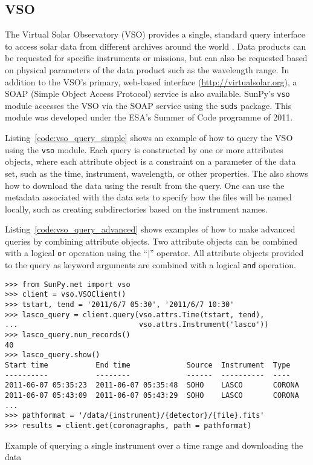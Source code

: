 \subsection{VSO}\label{ssec:vso}

The Virtual Solar Observatory (VSO) provides a single, standard query
interface to access solar data from different archives around the world
 \citep{hill2009}.
Data products can be requested for specific instruments or missions, but
can also be requested based on physical parameters of the data product such
as the wavelength range.
In addition to the VSO's primary, web-based interface
(\url{http://virtualsolar.org}), a SOAP (Simple Object Access Protocol)
service is also available.
SunPy's \texttt{vso} module accesses the VSO via the SOAP service using the
\texttt{suds} package.
This module was developed under the ESA's Summer of Code programme of 2011.

Listing~\ref{code:vso_query_simple} shows an example of how to query the VSO
using the \texttt{vso} module.
Each query is constructed by one or more attributes objects, where each
attribute object is a constraint on a parameter of the data set, such as the
time, instrument, wavelength, or  other properties.
The also shows how to download the data using the result
from the query. One can use the metadata associated with the data sets to specify how the
files will be named locally, such as creating subdirectories based on the
instrument names.

Listing~\ref{code:vso_query_advanced} shows examples of how to make advanced
queries by combining attribute objects.
Two attribute objects can be combined with a logical \texttt{or} operation
using the ``$|$'' operator.
All attribute objects provided to the query as keyword arguments are combined
with a logical \texttt{and} operation.

\begin{listing}[H]
\begin{verbatim}
>>> from SunPy.net import vso
>>> client = vso.VSOClient()
>>> tstart, tend = '2011/6/7 05:30', '2011/6/7 10:30'
>>> lasco_query = client.query(vso.attrs.Time(tstart, tend),
...                            vso.attrs.Instrument('lasco'))
>>> lasco_query.num_records()
40
>>> lasco_query.show() 
Start time           End time             Source  Instrument  Type
----------           --------             ------  ----------  ----
2011-06-07 05:35:23  2011-06-07 05:35:48  SOHO    LASCO       CORONA
2011-06-07 05:43:09  2011-06-07 05:43:29  SOHO    LASCO       CORONA
...
>>> pathformat = '/data/{instrument}/{detector}/{file}.fits'
>>> results = client.get(coronagraphs, path = pathformat)
\end{verbatim}
\caption{Example of querying a single instrument over a time range and downloading the data}
\label{code:vso_query_simple}
\end{listing}

